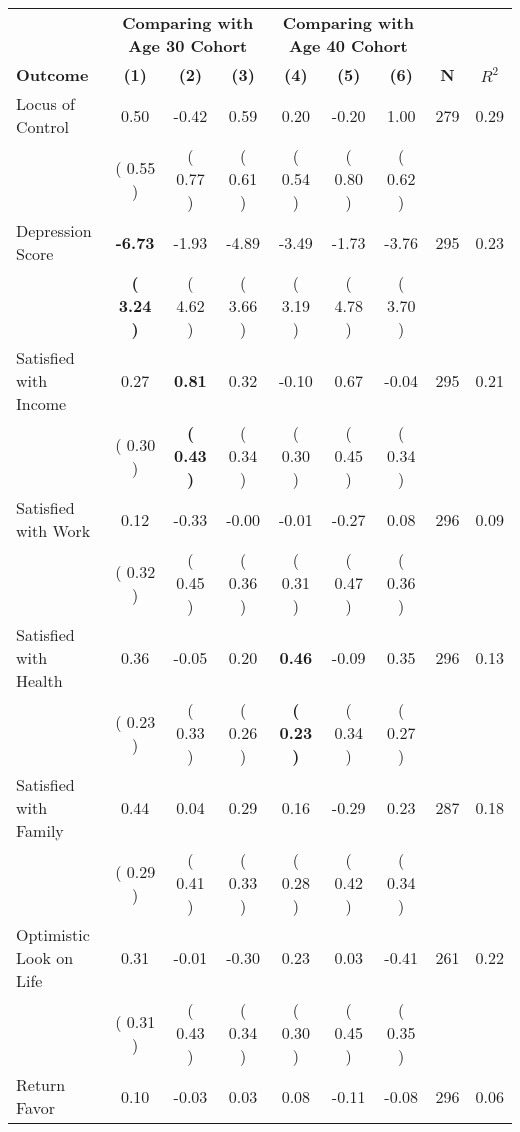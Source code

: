 \begin{tabular}{lcccccccc}
\toprule
 & \multicolumn{3}{c}{\textbf{Comparing with Age 30 Cohort}} & \multicolumn{3}{c}{\textbf{Comparing with Age 40 Cohort}} & \\
\cmidrule(lr){2-4} \cmidrule(lr){5-7} 
 \textbf{Outcome} & \textbf{(1)} & \textbf{(2)} & \textbf{(3)} & \textbf{(4)} & \textbf{(5)} & \textbf{(6)} & \textbf{N} & \textbf{$ R^2$} \\
\midrule
Locus of Control &      0.50 &     -0.42 &      0.59 &      0.20 &     -0.20 &      1.00 & 279 &       0.29 \\ 
 & (     0.55 ) & (     0.77 ) & (     0.61 ) & (     0.54 ) & (     0.80 ) & (     0.62 ) & \\
Depression Score & \textbf{    -6.73} &     -1.93 &     -4.89 &     -3.49 &     -1.73 &     -3.76 & 295 &       0.23 \\ 
 & \textbf{(     3.24 )} & (     4.62 ) & (     3.66 ) & (     3.19 ) & (     4.78 ) & (     3.70 ) & \\
Satisfied with Income &      0.27 & \textbf{     0.81} &      0.32 &     -0.10 &      0.67 &     -0.04 & 295 &       0.21 \\ 
 & (     0.30 ) & \textbf{(     0.43 )} & (     0.34 ) & (     0.30 ) & (     0.45 ) & (     0.34 ) & \\
Satisfied with Work &      0.12 &     -0.33 &     -0.00 &     -0.01 &     -0.27 &      0.08 & 296 &       0.09 \\ 
 & (     0.32 ) & (     0.45 ) & (     0.36 ) & (     0.31 ) & (     0.47 ) & (     0.36 ) & \\
Satisfied with Health &      0.36 &     -0.05 &      0.20 & \textbf{     0.46} &     -0.09 &      0.35 & 296 &       0.13 \\ 
 & (     0.23 ) & (     0.33 ) & (     0.26 ) & \textbf{(     0.23 )} & (     0.34 ) & (     0.27 ) & \\
Satisfied with Family &      0.44 &      0.04 &      0.29 &      0.16 &     -0.29 &      0.23 & 287 &       0.18 \\ 
 & (     0.29 ) & (     0.41 ) & (     0.33 ) & (     0.28 ) & (     0.42 ) & (     0.34 ) & \\
Optimistic Look on Life &      0.31 &     -0.01 &     -0.30 &      0.23 &      0.03 &     -0.41 & 261 &       0.22 \\ 
 & (     0.31 ) & (     0.43 ) & (     0.34 ) & (     0.30 ) & (     0.45 ) & (     0.35 ) & \\
Return Favor &      0.10 &     -0.03 &      0.03 &      0.08 &     -0.11 &     -0.08 & 296 &       0.06 \\ 

\end{tabular}
